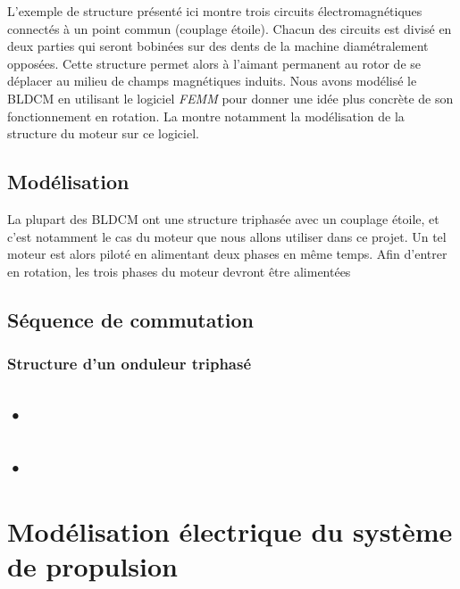 				 L'exemple de structure présenté ici montre trois circuits électromagnétiques connectés à un point commun (couplage étoile). Chacun des circuits est divisé en deux parties qui seront bobinées sur des dents de la machine diamétralement opposées. Cette structure permet alors à l'aimant permanent au rotor de se déplacer au milieu de champs magnétiques induits. Nous avons modélisé le BLDCM en utilisant le logiciel \textit{FEMM} pour donner une idée plus concrète de son fonctionnement en rotation. La montre notamment la modélisation de la structure du moteur sur ce logiciel.
				 
				 \subsection{Modélisation}
				 

				 La plupart des BLDCM ont une structure triphasée avec un couplage étoile, et c'est notamment le cas du moteur que nous allons utiliser dans ce projet. Un tel moteur est alors piloté en alimentant deux phases en même temps. Afin d'entrer en rotation, les trois phases du moteur devront être alimentées 
				 
				 \subsection{Séquence de commutation}
				 
				  
				 \subsubsection{Structure d'un onduleur triphasé}
				 
				 \subsection{•}
				 
				 \subsection{•}
				 
		\section{Modélisation électrique du système de propulsion}
			
